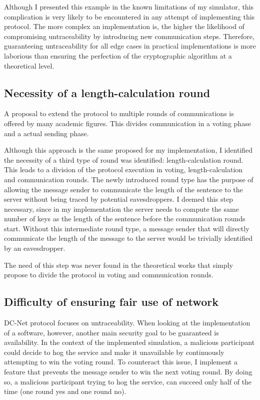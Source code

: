 Although I presented this example in the known limitations of my simulator, this complication is very likely to be encountered in any attempt of implementing this protocol. The more complex an implementation is, the higher the likelihood of compromising untraceability by introducing new communication steps. Therefore, guaranteeing untraceability for all edge cases in practical implementations is more laborious than ensuring the perfection of the cryptographic algorithm at a theoretical level. 


\subsection{Necessity of a length-calculation round}
A proposal to extend the protocol to multiple rounds of communications is offered by many academic figures. This divides communication in a voting phase and a actual sending phase.

Although this approach is the same proposed for my implementation, I identified the necessity of a third type of round was identified: length-calculation round. This leads to a division of the protocol execution in voting, length-calculation and communication rounds. The newly introduced round type has the purpose of allowing the message sender to communicate the length of the sentence to the server without being traced by potential eavesdroppers. I deemed this step necessary, since in my implementation the server needs to compute the same number of keys as the length of the sentence before the communication rounds start. Without this intermediate round type, a message sender that will directly communicate the length of the message to the server would be trivially identified by an eavesdropper.

The need of this step was never found in the theoretical works that simply propose to divide the protocol in voting and communication rounds.


\subsection{Difficulty of ensuring fair use of network}
DC-Net protocol focuses on untraceability. When looking at the implementation of a software, however, another main security goal to be guaranteed is availability. In the context of the implemented simulation, a malicious participant could decide to hog the service and make it unavailable by continuously attempting to win the voting round. To counteract this issue, I implement a feature that prevents the message sender to win the next voting round. By doing so, a malicious participant trying to hog the service, can succeed only half of the time (one round yes and one round no).


